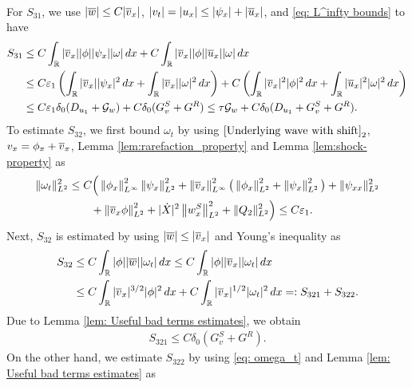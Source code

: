 \documentclass[11pt,reqno]{amsart}
\begin{document}
\begin{appendix}
\begin{align*}
\end{align*}
For $S_{31}$, we use $|\overline{w}| \le C |\overline{v}_x|$, $|v_t|=|u_x| \le |\psi_x|+|\overline{u}_x|$, and \eqref{eq: L^infty bounds} to have
\begin{align*}
S_{31} &\le C \int_\mathbb{R} |\overline{v}_x| |\phi| |\psi_x| |\omega| \, dx+ C \int_\mathbb{R} |\overline{v}_x| |\phi|  |\overline{u}_x| |\omega| \, dx \\ 
&\le C \varepsilon_1 \left( \int_\mathbb{R} |\overline{v}_x||\psi_x|^2 \, dx + \int_\mathbb{R} |\overline{v}_x| |\omega|^2 \, dx \right)+C \left( \int_\mathbb{R} |\overline{v}_x|^2|\phi|^2 \, dx + \int_\mathbb{R} |\overline{u}_x|^2 |\omega|^2 \, dx \right) \\ 
&\le C \varepsilon_1 \delta_0 (D_{u_1}+\mathcal{G}_w) + C \delta_0 ( G^S_v+G^R) \le \tau \mathcal{G}_w + C \delta_0 (D_{u_1} + G^S_v+G^R).
\end{align*}
To estimate $S_{32}$, we first bound $\omega_t$ by using $\eqref{Underlying wave with shift}_2$, $v_x = \phi_x + \overline{v}_x$, Lemma \ref{lem:rarefaction_property} and  Lemma \ref{lem:shock-property} as
\begin{equation}\label{eq: omega_t}
\begin{aligned}
\|\omega_t\|_{L^2}^2 
&\le C \Big( \left\lVert\phi_x\right\rVert_{L^\infty}^2 \left\lVert\psi_x\right\rVert_{L^2}^2+ \left\lVert\overline{v}_x\right\rVert_{L^\infty}^2 \big(\left\lVert\phi_x\right\rVert_{L^2}^2 + \left\lVert\psi_x\right\rVert_{L^2}^2 \big)  +\|\psi_{xx}\|_{L^2}^2 \\
& \qquad +\left\lVert\overline{v}_x \phi\right\rVert_{L^2}^2 + |\dot{X}|^2 \left\lVert w^S_x\right\rVert_{L^2}^2 +\|Q_2\|_{L^2}^2 \Big) \le C \varepsilon_1.
\end{aligned}
\end{equation}
Next, $S_{32}$ is estimated by using $|\overline{w}| \le |\overline{v}_x|$ and Young's inequality as 
\begin{align*}
S_{32} &\le C \int_\mathbb{R} |\phi| |\overline{w}| |\omega_t| \, dx \le C \int_\mathbb{R} |\phi| |\overline{v}_x| |\omega_t| \, dx \\
&\le C \int_\mathbb{R} |\overline{v}_x|^{3/2} |\phi|^2 \, dx +  C \int_\mathbb{R} |\overline{v}_x|^{1/2} |\omega_t|^2 \, dx=: S_{321}+S_{322}. 
\end{align*}
Due to Lemma \ref{lem: Useful bad terms estimates}, we obtain
\begin{equation} \label{eq: cS_21}
\begin{aligned}
S_{321} \le C \delta_0 \left( G^S_v+G^R \right).
\end{aligned}
\end{equation}
On the other hand, we estimate $S_{322}$ by using \eqref{eq: omega_t} and Lemma \ref{lem: Useful bad terms estimates} as 
\begin{align*}

\end{align*}
\end{appendix}
\end{document}
